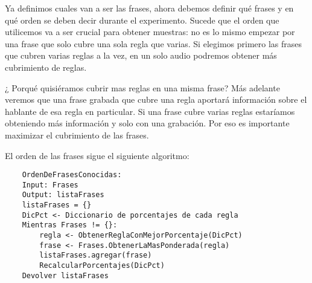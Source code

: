 Ya definimos cuales van a ser las frases, ahora debemos definir qué frases y en qué orden se deben decir durante el experimento. Sucede que el orden que utilicemos va a ser crucial para obtener muestras: no es lo mismo empezar por una frase que solo cubre una sola regla que varias. Si elegimos primero las frases que cubren varias reglas a la vez, en un solo audio podremos obtener más cubrimiento de reglas. 

¿ Porqué quisiéramos cubrir mas reglas en una misma frase? Más adelante veremos que una frase grabada que cubre una regla aportará información sobre el hablante de esa regla en particular. Si una frase cubre varias reglas estaríamos obteniendo más información y solo con una grabación. Por eso es importante maximizar el cubrimiento de las frases.  

El orden de las frases sigue el siguiente algoritmo:

\begin{lstlisting}
    OrdenDeFrasesConocidas:
    Input: Frases
    Output: listaFrases 
    listaFrases = {}
    DicPct <- Diccionario de porcentajes de cada regla
    Mientras Frases != {}:
    	regla <- ObtenerReglaConMejorPorcentaje(DicPct)
    	frase <- Frases.ObtenerLaMasPonderada(regla)
    	listaFrases.agregar(frase)
    	RecalcularPorcentajes(DicPct)
    Devolver listaFrases
\end{lstlisting}

